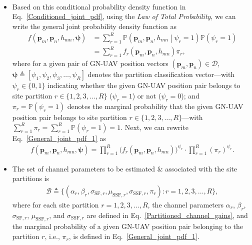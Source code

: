 \documentclass{article}
\begin{document}
\begin{itemize}
\begin{align}
    \end{align}
    \item Based on this conditional probability density function in Eq.~\eqref{Conditioned_joint_pdf}, using the \emph{Law of Total Probability}, we can write the general joint probability density function as
    \begin{align}\label{General_joint_pdf_1}
        f\left(\mathbf{p}_{m},\mathbf{p}_{n},h_{mn},\boldsymbol{\psi}\right)&{=}\sum_{r{=}1}^{R}\mathbb{P}\left(\mathbf{p}_{m},\mathbf{p}_{n},h_{mn}\middle|\psi_{r}{=}1\right)\mathbb{P}\left(\psi_{r}{=}1\right)\nonumber\\&{=}\sum_{r{=}1}^{R}f_{r}\left(\mathbf{p}_{m},\mathbf{p}_{n},h_{mn}\right)\pi_{r},
    \end{align}
    where for a given pair of GN-UAV position vectors $\left(\mathbf{p}_{m},\mathbf{p}_{n}\right){\in}\mathcal{D}$, $\boldsymbol{\psi}{\triangleq}[\psi_{1},\psi_{2},\psi_{3},{\dots},\psi_{R}]$ denotes the partition classification vector---with $\psi_{r}{\in}\{0,1\}$ indicating whether the given GN-UAV position pair belongs to site partition $r{\in}\{1,2,3,{\dots},R\}$ ($\psi_{r}{=}1$) or not ($\psi_{r}{=}0$); and $\pi_{r}{=}\mathbb{P}\left(\psi_{r}{=}1\right)$ denotes the marginal probability that the given GN-UAV position pair belongs to site partition $r{\in}\{1,2,3,{\dots},R\}$---with $\sum_{r{=}1}^{R}\pi_{r}{=}\sum_{r{=}1}^{R}\mathbb{P}\left(\psi_{r}{=}1\right){=}1$. Next, we can rewrite Eq.~\eqref{General_joint_pdf_1} as
    \begin{align}\label{General_joint_pdf_2}
        f\left(\mathbf{p}_{m},\mathbf{p}_{n},h_{mn},\boldsymbol{\psi}\right){=}\prod_{r{=}1}^{R}\Big(f_{r}\left(\mathbf{p}_{m},\mathbf{p}_{n},h_{mn}\right)\Big)^{\psi_{r}}{\cdot}\prod_{r{=}1}^{R}\left(\pi_{r}\right)^{\psi_{r}}.
    \end{align}
    \item The set of channel parameters to be estimated \& associated with the site partitions is
    \begin{align}\label{Parameters_to_be_estimated}
        \mathcal{B}{\triangleq}\Big\{\left(\alpha_{r},\beta_{r},\sigma_{\mathrm{SF},r},\mu_{\mathrm{SSF},r},\sigma_{\mathrm{SSF},r},\pi_{r}\right):r{=}1,2,3,{\dots},R\Big\},
    \end{align}
    where for each site partition $r{=}1,2,3,{\dots},R$, the channel parameters $\alpha_{r}$, $\beta_{r}$, $\sigma_{\mathrm{SF},r}$, $\mu_{\mathrm{SSF},r}$, and $\sigma_{\mathrm{SSF},r}$ are defined in Eq.~\eqref{Partitioned_channel_gains}, and the marginal probability of a given GN-UAV position pair belonging to the partition $r$, i.e., $\pi_{r}$, is defined in Eq.~\eqref{General_joint_pdf_1}.
\end{itemize}
\end{document}
